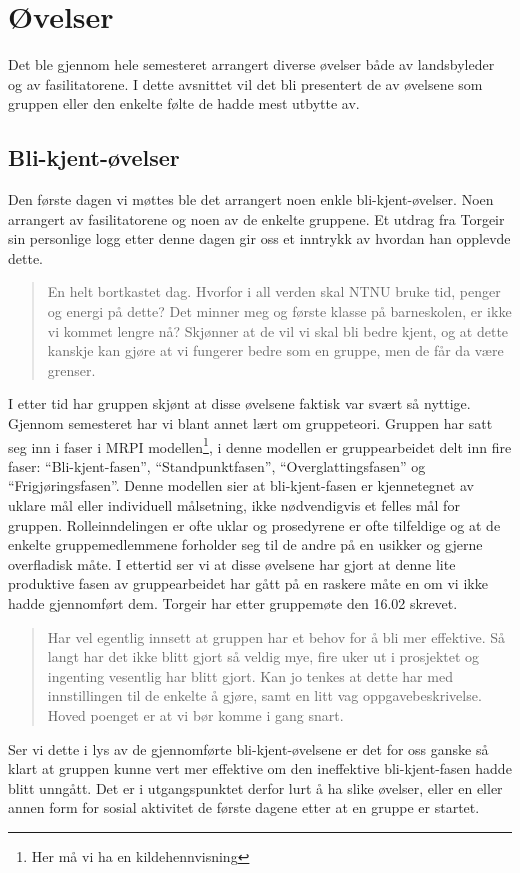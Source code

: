 \section{Øvelser}
Det ble gjennom hele semesteret arrangert diverse øvelser både av landsbyleder og av fasilitatorene. I dette avsnittet vil det bli presentert de av øvelsene som gruppen eller den enkelte følte de hadde mest utbytte av.
\subsection{Bli-kjent-øvelser}
Den første dagen vi møttes ble det arrangert noen enkle bli-kjent-øvelser. Noen arrangert av fasilitatorene og noen av de enkelte gruppene. Et utdrag fra Torgeir sin personlige logg etter denne dagen gir oss et inntrykk av hvordan han opplevde dette.
\begin{quote}
En helt bortkastet dag. Hvorfor i all verden skal NTNU bruke tid, penger og energi på dette? Det minner meg og første klasse på barneskolen, er ikke vi kommet lengre nå? Skjønner at de vil vi skal bli bedre kjent, og at dette kanskje kan gjøre at vi fungerer bedre som en gruppe, men de får da være grenser. 
\end{quote}
I etter tid har gruppen skjønt at disse øvelsene faktisk var svært så nyttige. Gjennom semesteret har vi blant annet lært om gruppeteori. Gruppen har satt seg inn i faser i MRPI modellen\footnote{Her må vi ha en kildehennvisning}, i denne modellen er gruppearbeidet delt inn fire faser: “Bli-kjent-fasen”, “Standpunktfasen”, “Overglattingsfasen” og “Frigjøringsfasen”. Denne modellen sier at bli-kjent-fasen er kjennetegnet av uklare mål eller individuell målsetning, ikke nødvendigvis et felles mål for gruppen. Rolleinndelingen er ofte uklar og prosedyrene er ofte tilfeldige og at de enkelte gruppemedlemmene forholder seg til de andre på en usikker og gjerne overfladisk måte. I ettertid ser vi at disse øvelsene har gjort at denne lite produktive fasen av gruppearbeidet har gått på en raskere måte en om vi ikke hadde gjennomført dem. Torgeir har etter gruppemøte den 16.02 skrevet.
\begin{quote}
Har vel egentlig innsett at gruppen har et behov for å bli mer effektive. Så langt har det ikke blitt gjort så veldig mye, fire uker ut i prosjektet og ingenting vesentlig har blitt gjort. Kan jo tenkes at dette har med innstillingen til de enkelte å gjøre, samt en litt vag oppgavebeskrivelse. Hoved poenget er at vi bør komme i gang snart. 
\end{quote}
Ser vi dette i lys av de gjennomførte bli-kjent-øvelsene er det for oss ganske så klart at gruppen kunne vert mer effektive om den ineffektive bli-kjent-fasen hadde blitt unngått. Det er i utgangspunktet derfor lurt å ha slike øvelser, eller en eller annen form for sosial aktivitet de første dagene etter at en gruppe er startet. 
